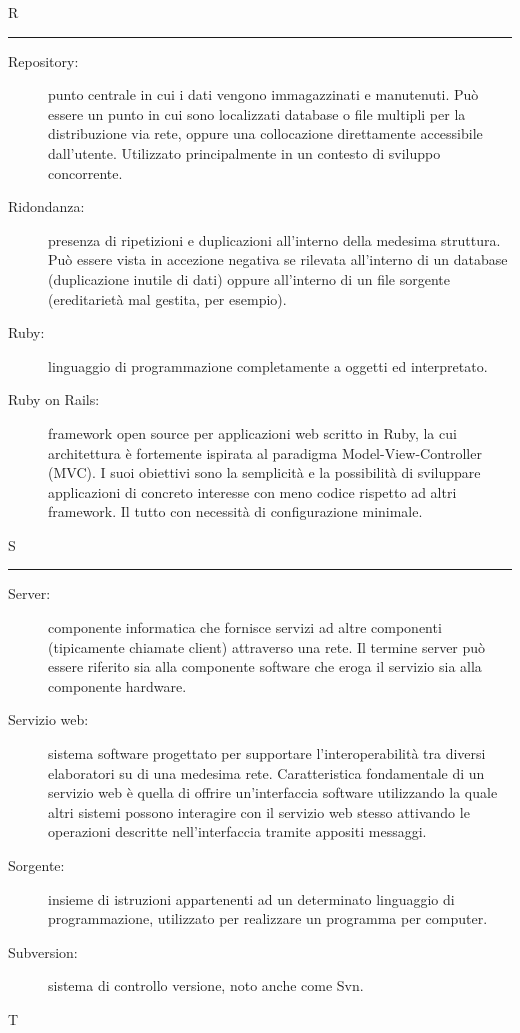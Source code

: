 \documentclass[11pt,a4paper]{article}
\begin{document}
\bigskip
\Huge R \bigskip
\hrule
\smallskip
\normalsize
\begin{description}
	\item[Repository:] punto centrale in cui i dati vengono immagazzinati e manutenuti. Può essere un punto in cui sono localizzati database o file multipli per la distribuzione via rete, oppure una collocazione direttamente accessibile dall'utente. Utilizzato principalmente in un contesto di sviluppo concorrente.
	\item[Ridondanza:] presenza di ripetizioni e duplicazioni all'interno della medesima struttura. Può essere vista in accezione negativa se rilevata all'interno di un database (duplicazione inutile di dati) oppure all'interno di un file sorgente (ereditarietà mal gestita, per esempio).
	\item[Ruby:] linguaggio di programmazione completamente a oggetti ed interpretato.
	\item[Ruby on Rails:] framework open source per applicazioni web scritto in Ruby, la cui architettura è fortemente ispirata al paradigma Model-View-Controller (MVC). I suoi obiettivi sono la semplicità e la possibilità di sviluppare applicazioni di concreto interesse con meno codice rispetto ad altri framework. Il tutto con necessità di configurazione minimale.
\end{description}
\bigskip
\Huge S \bigskip
\hrule
\smallskip
\normalsize
\begin{description}
	\item[Server:] componente informatica che fornisce servizi ad altre componenti (tipicamente chiamate client) attraverso una rete. Il termine server può essere riferito sia alla componente software che eroga il servizio sia alla componente hardware.
	\item[Servizio web:] sistema software progettato per supportare l'interoperabilità tra diversi elaboratori su di una medesima rete. Caratteristica fondamentale di un servizio web è quella di offrire un'interfaccia software utilizzando la quale altri sistemi possono interagire con il servizio web stesso attivando le operazioni descritte nell'interfaccia tramite appositi messaggi.
	\item[Sorgente:] insieme di istruzioni appartenenti ad un determinato linguaggio di programmazione, utilizzato per realizzare un programma per computer.
	\item[Subversion:] sistema di controllo versione, noto anche come Svn.
\end{description}
\bigskip
\Huge T \bigskip
\end{document}
